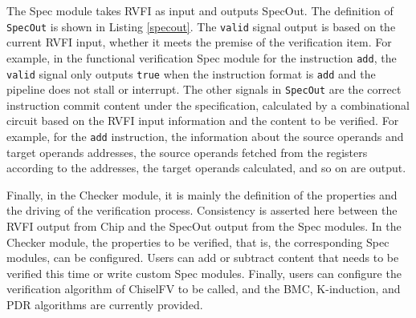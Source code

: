 \documentclass[conference]{IEEEtran}
\theoremstyle{definition}
\begin{document}
The Spec module takes RVFI as input and outputs SpecOut.
The definition of \verb|SpecOut| is shown in Listing \ref{specout}.
The \verb|valid| signal output is based on the current RVFI input, whether it meets the premise of the verification item.
For example, in the functional verification Spec module for the instruction \verb|add|, the \verb|valid| signal only outputs \verb|true| when the instruction format is \verb|add| and the pipeline does not stall or interrupt.
The other signals in \verb|SpecOut| are the correct instruction commit content under the specification, calculated by a combinational circuit based on the RVFI input information and the content to be verified.
For example, for the \verb|add| instruction, the information about the source operands and target operands addresses, the source operands fetched from the registers according to the addresses, the target operands calculated, and so on are output.

Finally, in the Checker module, it is mainly the definition of the properties and the driving of the verification process.
Consistency is asserted here between the RVFI output from Chip and the SpecOut output from the Spec modules.
In the Checker module, the properties to be verified, that is, the corresponding Spec modules, can be configured.
Users can add or subtract content that needs to be verified this time or write custom Spec modules.
Finally, users can configure the verification algorithm of ChiselFV to be called, and the BMC, K-induction, and PDR algorithms are currently provided.
\end{document}
